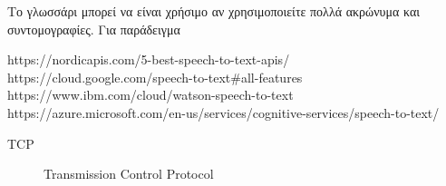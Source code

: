 \documentclass[oneside, 12pt]{book}
\begin{document}
%

%
\begin{Glossary}
Το γλωσσάρι μπορεί να είναι χρήσιμο αν χρησιμοποιείτε πολλά ακρώνυμα
και συντομογραφίες. Για παράδειγμα

https://nordicapis.com/5-best-speech-to-text-apis/
\newline
https://cloud.google.com/speech-to-text\#all-features
\newline
https://www.ibm.com/cloud/watson-speech-to-text
\newline
https://azure.microsoft.com/en-us/services/cognitive-services/speech-to-text/
\begin{description}
\item[TCP]Transmission Control Protocol
\end{description}
\end{Glossary}

\printbibliography
\lastpageinfo
\end{document}
